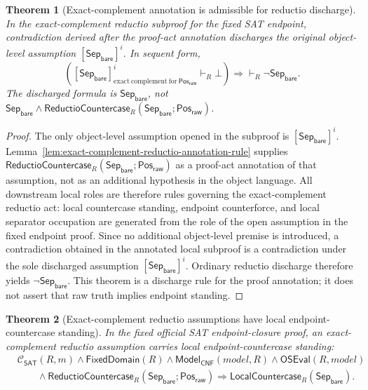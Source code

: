 \documentclass[11pt]{article}
\newtheorem{theorem}{Theorem}[section]
\theoremstyle{definition}
\theoremstyle{remark}
\newcommand{\PosRaw}{\mathsf{Pos}_{\mathsf{raw}}}
\newcommand{\SepBare}{\mathsf{Sep}_{\mathsf{bare}}}
\newcommand{\ClayCtx}{\mathcal{C}_{\mathsf{SAT}}(R,m)}
\newcommand{\FixedDom}{\mathsf{FixedDomain}}
\newcommand{\ModelOfCnf}{\mathsf{Model}_{\mathsf{CNF}}}
\newcommand{\OfficialSATEval}{\mathsf{OSEval}}
\newcommand{\LocalCountercase}{\mathsf{LocalCountercase}}
\newcommand{\ReductioCountercase}{\mathsf{ReductioCountercase}}
\begin{document}
\begin{theorem}[Exact-complement annotation is admissible for reductio discharge]
\label{thm:exact-complement-annotation-discharge}
In the exact-complement reductio subproof for the fixed SAT endpoint, contradiction derived after the proof-act annotation discharges the original object-level assumption \([\SepBare]^i\). In sequent form,
\[
  \left([\SepBare]^i_{\mathrm{exact\ complement\ for}\ \PosRaw}\vdash_R \bot\right)
  \Rightarrow \vdash_R \neg\SepBare.
\]
The discharged formula is \(\SepBare\), not \(\SepBare\wedge\ReductioCountercase_R(\SepBare;\PosRaw)\).
\end{theorem}

\begin{proof}
The only object-level assumption opened in the subproof is \([\SepBare]^i\). Lemma~\ref{lem:exact-complement-reductio-annotation-rule} supplies \(\ReductioCountercase_R(\SepBare;\PosRaw)\) as a proof-act annotation of that assumption, not as an additional hypothesis in the object language. All downstream local roles are therefore rules governing the exact-complement reductio act: local countercase standing, endpoint counterforce, and local separator occupation are generated from the role of the open assumption in the fixed endpoint proof. Since no additional object-level premise is introduced, a contradiction obtained in the annotated local subproof is a contradiction under the sole discharged assumption \([\SepBare]^i\). Ordinary reductio discharge therefore yields \(\neg\SepBare\). This theorem is a discharge rule for the proof annotation; it does not assert that raw truth implies endpoint standing.
\end{proof}


\begin{theorem}[Exact-complement reductio assumptions have local endpoint-countercase standing]
\label{thm:reductio-countercase-yields-local-countercase}
In the fixed official SAT endpoint-closure proof, an exact-complement reductio assumption carries local endpoint-countercase standing:
\[
\begin{aligned}
  &\ClayCtx\wedge\FixedDom(R)\wedge\ModelOfCnf(model,R)\wedge\OfficialSATEval(R,model)\\
  &\qquad\wedge\ReductioCountercase_R(\SepBare;\PosRaw)\Rightarrow \LocalCountercase_R(\SepBare).
\end{aligned}
\]
\end{theorem}
\end{document}
